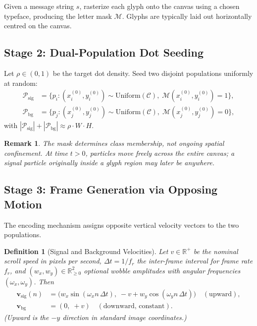 \documentclass[12pt,a4paper]{article}
\newtheorem{definition}{Definition}
\newtheorem{remark}{Remark}
\begin{document}
Given a message string $s$, rasterize each glyph onto the canvas using a
chosen typeface, producing the letter mask $\mathcal{M}$.  Glyphs are
typically laid out horizontally centred on the canvas.

\subsection{Stage 2: Dual-Population Dot Seeding}

Let $\rho \in (0, 1)$ be the target dot density.  Seed two disjoint
populations uniformly at random:
\begin{align}
  \mathcal{P}_{\mathrm{sig}} &= \bigl\{ p_i :
    (x_i^{(0)}, y_i^{(0)}) \sim \mathrm{Uniform}(\mathcal{C}),\;
    \mathcal{M}(x_i^{(0)}, y_i^{(0)}) = 1 \bigr\}, \\
  \mathcal{P}_{\mathrm{bg}}  &= \bigl\{ p_j :
    (x_j^{(0)}, y_j^{(0)}) \sim \mathrm{Uniform}(\mathcal{C}),\;
    \mathcal{M}(x_j^{(0)}, y_j^{(0)}) = 0 \bigr\},
\end{align}
with $|\mathcal{P}_{\mathrm{sig}}| + |\mathcal{P}_{\mathrm{bg}}|
\approx \rho \cdot W \cdot H$.

\begin{remark}
The mask determines \emph{class membership}, not ongoing spatial
confinement.  At time $t > 0$, particles move freely across the entire
canvas; a signal particle originally inside a glyph region may later be
anywhere.
\end{remark}

\subsection{Stage 3: Frame Generation via Opposing Motion}

The encoding mechanism assigns opposite vertical velocity vectors to the
two populations.

\begin{definition}[Signal and Background Velocities]
Let $v \in \mathbb{R}^+$ be the nominal scroll speed in pixels per second,
$\Delta t = 1/f_r$ the inter-frame interval for frame rate $f_r$, and
$(w_x, w_y) \in \mathbb{R}^2_{\geq 0}$ optional wobble amplitudes with
angular frequencies $(\omega_x, \omega_y)$.  Then
\begin{align}
  \mathbf{v}_{\mathrm{sig}}(n) &=
    \bigl(w_x \sin(\omega_x n\,\Delta t),\;
           -v + w_y \cos(\omega_y n\,\Delta t)\bigr)
    \quad (\text{upward}), \\
  \mathbf{v}_{\mathrm{bg}} &= (0,\; +v)
    \quad (\text{downward, constant}).
\end{align}
(Upward is the $-y$ direction in standard image coordinates.)
\end{definition}
\end{document}
